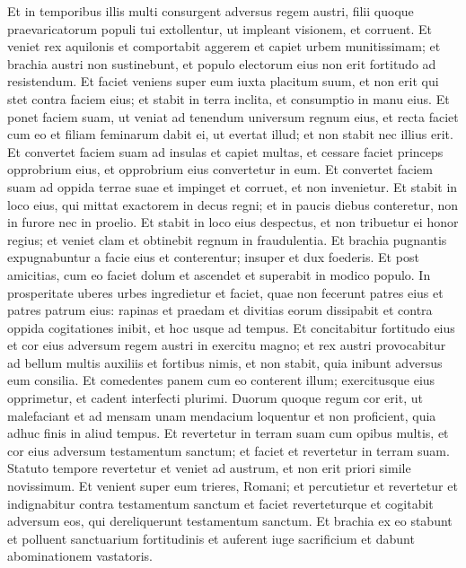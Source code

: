 \begin{biblechapter}
\begin{biblechapter}
\begin{biblechapter}
\begin{biblechapter}
\begin{biblechapter}
\begin{biblechapter}
\begin{biblechapter}
\begin{biblechapter}
\begin{biblechapter}
\begin{biblechapter}
\begin{biblechapter}
\verse Et in temporibus illis multi consurgent adversus regem austri, filii quoque praevaricatorum populi tui extollentur, ut impleant visionem, et corruent. 
\verse Et veniet rex aquilonis et comportabit aggerem et capiet urbem munitissimam; et brachia austri non sustinebunt, et populo electorum eius non erit fortitudo ad resistendum. 
\verse Et faciet veniens super eum iuxta placitum suum, et non erit qui stet contra faciem eius; et stabit in terra inclita, et consumptio in manu eius. 
\verse Et ponet faciem suam, ut veniat ad tenendum universum regnum eius, et recta faciet cum eo et filiam feminarum dabit ei, ut evertat illud; et non stabit nec illius erit. 
\verse Et convertet faciem suam ad insulas et capiet multas, et cessare faciet princeps opprobrium eius, et opprobrium eius convertetur in eum. 
\verse Et convertet faciem suam ad oppida terrae suae et impinget et corruet, et non invenietur. 
\verse Et stabit in loco eius, qui mittat exactorem in decus regni; et in paucis diebus conteretur, non in furore nec in proelio.
 \verse Et stabit in loco eius despectus, et non tribuetur ei honor regius; et veniet clam et obtinebit regnum in fraudulentia. 
\verse Et brachia pugnantis expugnabuntur a facie eius et conterentur; insuper et dux foederis. 
\verse Et post amicitias, cum eo faciet dolum et ascendet et superabit in modico populo. 
 \verse In prosperitate uberes urbes ingredietur et faciet, quae non fecerunt patres eius et patres patrum eius: rapinas et praedam et divitias eorum dissipabit et contra oppida cogitationes inibit, et hoc usque ad tempus. 
\verse Et concitabitur fortitudo eius et cor eius adversum regem austri in exercitu magno; et rex austri provocabitur ad bellum multis auxiliis et fortibus nimis, et non stabit, quia inibunt adversus eum consilia. 
\verse Et comedentes panem cum eo conterent illum; exercitusque eius opprimetur, et cadent interfecti plurimi. 
 \verse Duorum quoque regum cor erit, ut malefaciant et ad mensam unam mendacium loquentur et non proficient, quia adhuc finis in aliud tempus. 
\verse Et revertetur in terram suam cum opibus multis, et cor eius adversum testamentum sanctum; et faciet et revertetur in terram suam. 
\verse Statuto tempore revertetur et veniet ad austrum, et non erit priori simile novissimum. 
\verse Et venient super eum trieres, Romani; et percutietur et revertetur et indignabitur contra testamentum sanctum et faciet reverteturque et cogitabit adversum eos, qui dereliquerunt testamentum sanctum. 
\verse Et brachia ex eo stabunt et polluent sanctuarium fortitudinis et auferent iuge sacrificium et dabunt abominationem vastatoris. 

\end{biblechapter}
\end{biblechapter}
\end{biblechapter}
\end{biblechapter}
\end{biblechapter}
\end{biblechapter}
\end{biblechapter}
\end{biblechapter}
\end{biblechapter}
\end{biblechapter}
\end{biblechapter}

